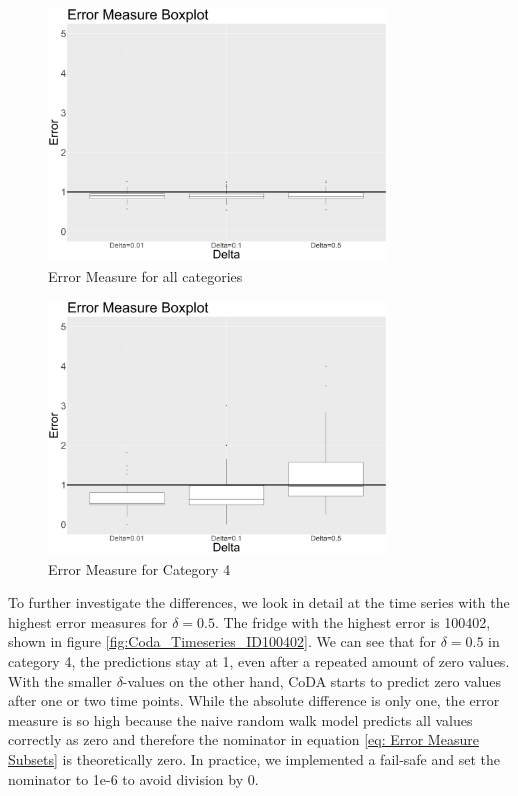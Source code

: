 \begin{figure}[htbp]
	\centering
		\includegraphics[width=0.80\textwidth]{Graphiken/ErrorMeasureCoDA_Box_all__Variation_dL.png}
	\caption{Error Measure for all categories}
	\label{fig:ErrorMeasureCoDA_Box_all__Variation_dL}
\end{figure}

\begin{figure}[htbp]
	\centering
		\includegraphics[width=0.80\textwidth]{Graphiken/ErrorMeasureCoDA_Box_all__Variation_dLcat4.png}
	\caption{Error Measure for Category 4}
	\label{fig:ErrorMeasureCoDA_Box_all__Variation_dLcat4}
\end{figure}



To further investigate the differences, we look in detail at the time series with the highest error measures for $\delta=0.5$. The fridge with the highest error is 100402, shown in figure \ref{fig:Coda_Timeseries_ID100402}. We can see that for $\delta=0.5$ in category 4, the predictions stay at 1, even after a repeated amount of zero values. With the smaller $\delta$-values on the other hand, CoDA starts to predict zero values after one or two time points. While the absolute difference is only one, the error measure is so high because the naive random walk model predicts all values correctly as zero and therefore the nominator in equation \ref{eq: Error Measure Subsets} is theoretically zero. In practice, we implemented a fail-safe and set the nominator to 1e-6 to avoid division by 0. 


